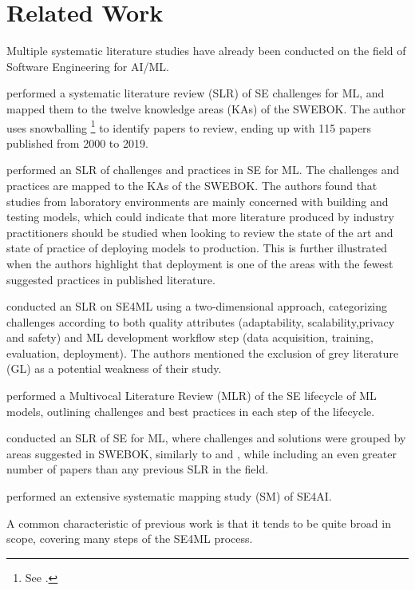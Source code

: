 \chapter{Related Work}
\label{ch:related_work}
Multiple systematic literature studies have already been conducted on the field of Software Engineering for AI/ML.

\textcite{Kumeno2020} performed a systematic literature review (SLR) of SE challenges for ML, and mapped them to the twelve knowledge areas (KAs) of the SWEBOK.
The author uses snowballing \footnote{See \textcite{Wohlin2014}.} to identify papers to review, ending up with 115 papers published from 2000 to 2019.

\textcite{Nascimento2020} performed an SLR of challenges and practices in SE for ML. The challenges and practices are mapped to the KAs of the SWEBOK.
The authors found that studies from laboratory environments are mainly concerned with building and testing models, which could indicate that more literature produced by industry practitioners should be studied when looking to review the state of the art and state of practice of deploying models to production.
This is further illustrated when the authors highlight that deployment is one of the areas with the fewest suggested practices in published literature.

\textcite{Lwakatare2020} conducted an SLR on SE4ML using a two-dimensional approach, categorizing  challenges according to both  quality  attributes  (adaptability, scalability,privacy and safety) and ML development workflow step (data acquisition, training, evaluation, deployment).
The authors mentioned the exclusion of grey  literature (GL) as a potential weakness of their study.


\textcite{John2021} performed a Multivocal Literature Review (MLR) of the SE lifecycle of ML models, outlining challenges and best practices in each step of the lifecycle.

\textcite{Giray2021} conducted an SLR of SE for ML, where challenges and solutions were grouped by areas suggested in SWEBOK, similarly to \cite{Kumeno2020} and \cite{Nascimento2020}, while including an even greater number of papers than any previous SLR in the field.

\textcite{MartinezFernandez2021} performed an extensive systematic mapping study (SM) of SE4AI.

A common characteristic of previous work is that it tends to be quite broad in scope, covering many steps of the SE4ML process.

